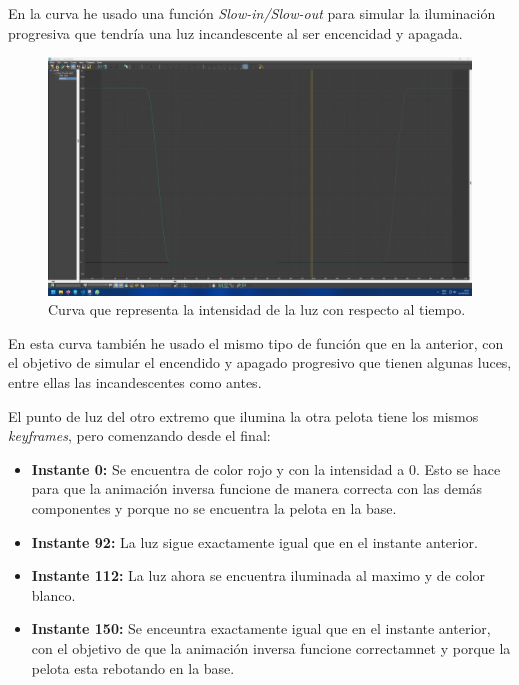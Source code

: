 \documentclass{article}
\begin{document}
En la curva he usado una función \textit{Slow-in/Slow-out} para simular la iluminación progresiva que tendría una luz incandescente al ser encencidad y apagada.

 \begin{figure}[H]
    \centering
    \includegraphics[width=\textwidth]{imagenes/curvas/LL/intensity.png}
    \caption{Curva que representa la intensidad de la luz con respecto al tiempo.}
 \end{figure}

 En esta curva también he usado el mismo tipo de función que en la anterior, con el objetivo de simular el encendido y apagado progresivo que tienen algunas luces, entre ellas las incandescentes como antes.

 \bigskip

 El punto de luz del otro extremo que ilumina la otra pelota tiene los mismos \textit{keyframes}, pero comenzando desde el final:

 \begin{itemize}
    \item \textbf{Instante 0: }Se encuentra de color rojo y con la intensidad a 0. Esto se hace para que la animación inversa funcione de manera correcta con las demás componentes y porque no se encuentra la pelota en la base.
    \item \textbf{Instante 92: }La luz sigue exactamente igual que en el instante anterior.
    \item \textbf{Instante 112: }La luz ahora se encuentra iluminada al maximo y de color blanco.
    \item \textbf{Instante 150: }Se enceuntra exactamente igual que en el instante anterior, con el objetivo de que la animación inversa funcione correctamnet y porque la pelota esta rebotando en la base.
 \end{itemize}
 
\end{document}

